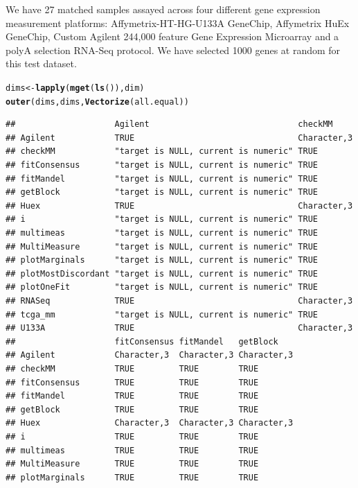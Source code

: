\documentclass{article}\usepackage[]{graphicx}\usepackage[]{color}
\makeatletter
\newcommand{\hlstd}[1]{\textcolor[rgb]{0.345,0.345,0.345}{#1}}%
\newcommand{\hlkwb}[1]{\textcolor[rgb]{0.69,0.353,0.396}{#1}}%
\newcommand{\hlkwd}[1]{\textcolor[rgb]{0.737,0.353,0.396}{\textbf{#1}}}%
\newenvironment{kframe}{%
 \def\at@end@of@kframe{}%
 \ifinner\ifhmode%
  \def\at@end@of@kframe{\end{minipage}}%
  \begin{minipage}{\columnwidth}%
 \fi\fi%
 \def\FrameCommand##1{\hskip\@totalleftmargin \hskip-\fboxsep
 \colorbox{shadecolor}{##1}\hskip-\fboxsep
     \hskip-\linewidth \hskip-\@totalleftmargin \hskip\columnwidth}%
 \MakeFramed {\advance\hsize-\width
   \@totalleftmargin\z@ \linewidth\hsize
   \@setminipage}}%
 {\par\unskip\endMakeFramed%
 \at@end@of@kframe}
\newenvironment{knitrout}{}{} %
\makeatother
\begin{document}
We have 27 matched samples assayed across four different gene expression measurement platforms: Affymetrix-HT-HG-U133A GeneChip,  Affymetrix HuEx GeneChip, Custom Agilent 244,000 feature Gene Expression Microarray and a polyA selection RNA-Seq protocol. We have selected 1000 genes at random for this test dataset.

\begin{knitrout}
\color{fgcolor}\begin{kframe}
\begin{alltt}
\hlstd{dims} \hlkwb{<-} \hlkwd{lapply}\hlstd{(}\hlkwd{mget}\hlstd{(}\hlkwd{ls}\hlstd{()), dim)}
\hlkwd{outer}\hlstd{(dims, dims,} \hlkwd{Vectorize}\hlstd{(all.equal))}
\end{alltt}
\begin{verbatim}
##                    Agilent                              checkMM    
## Agilent            TRUE                                 Character,3
## checkMM            "target is NULL, current is numeric" TRUE       
## fitConsensus       "target is NULL, current is numeric" TRUE       
## fitMandel          "target is NULL, current is numeric" TRUE       
## getBlock           "target is NULL, current is numeric" TRUE       
## Huex               TRUE                                 Character,3
## i                  "target is NULL, current is numeric" TRUE       
## multimeas          "target is NULL, current is numeric" TRUE       
## MultiMeasure       "target is NULL, current is numeric" TRUE       
## plotMarginals      "target is NULL, current is numeric" TRUE       
## plotMostDiscordant "target is NULL, current is numeric" TRUE       
## plotOneFit         "target is NULL, current is numeric" TRUE       
## RNASeq             TRUE                                 Character,3
## tcga_mm            "target is NULL, current is numeric" TRUE       
## U133A              TRUE                                 Character,3
##                    fitConsensus fitMandel   getBlock   
## Agilent            Character,3  Character,3 Character,3
## checkMM            TRUE         TRUE        TRUE       
## fitConsensus       TRUE         TRUE        TRUE       
## fitMandel          TRUE         TRUE        TRUE       
## getBlock           TRUE         TRUE        TRUE       
## Huex               Character,3  Character,3 Character,3
## i                  TRUE         TRUE        TRUE       
## multimeas          TRUE         TRUE        TRUE       
## MultiMeasure       TRUE         TRUE        TRUE       
## plotMarginals      TRUE         TRUE        TRUE       

\end{verbatim}
\end{kframe}
\end{knitrout}
\end{document}
